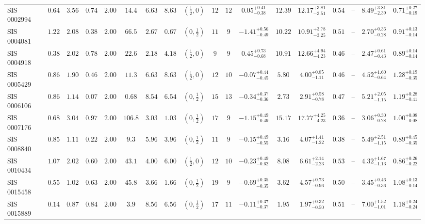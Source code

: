 \begin{longtable}{@{}lccccccccccccccccc@{}}
SIS 0002994 & $0.64$ & $3.56$ & $0.74$ & $2.00$ & $14.4$ & $6.63$ & $8.63$ & $(\frac12,0)$ & $12$ & $12$ & $0.05^{+0.41}_{-0.38}$ & $12.39$ & $12.17^{+3.81}_{-3.51}$ & $0.54$ & -- & $8.49^{+3.81}_{-2.39}$ & $0.71^{+0.27}_{-0.19}$\\
SIS 0004081 & $1.22$ & $2.08$ & $0.38$ & $2.00$ & $66.5$ & $2.67$ & $0.67$ & $(0,\frac12)$ & $11$ & $9$ & $-1.41^{+0.56}_{-0.49}$ & $10.22$ & $10.91^{+3.78}_{-3.25}$ & $0.51$ & -- & $2.70^{+0.36}_{-0.28}$ & $0.91^{+0.13}_{-0.14}$\\
SIS 0004918 & $0.38$ & $2.02$ & $0.78$ & $2.00$ & $22.6$ & $2.18$ & $4.18$ & $(\frac12,0)$ & $9$ & $9$ & $0.45^{+0.73}_{-0.68}$ & $10.91$ & $12.66^{+4.94}_{-4.23}$ & $0.46$ & -- & $2.47^{+0.61}_{-0.43}$ & $0.89^{+0.14}_{-0.14}$\\
SIS 0005429 & $0.86$ & $1.90$ & $0.46$ & $2.00$ & $11.3$ & $6.63$ & $8.63$ & $(\frac12,0)$ & $12$ & $10$ & $-0.07^{+0.44}_{-0.45}$ & $5.80$ & $4.00^{+0.85}_{-1.11}$ & $0.46$ & -- & $4.52^{+1.60}_{-0.64}$ & $1.28^{+0.19}_{-0.35}$\\
SIS 0006106 & $0.86$ & $1.14$ & $0.07$ & $2.00$ & $0.68$ & $8.54$ & $6.54$ & $(0,\frac12)$ & $15$ & $13$ & $-0.34^{+0.37}_{-0.36}$ & $2.73$ & $2.91^{+0.58}_{-0.78}$ & $0.47$ & -- & $5.21^{+2.05}_{-1.15}$ & $1.19^{+0.28}_{-0.41}$\\
SIS 0007176 & $0.68$ & $3.04$ & $0.97$ & $2.00$ & $106.8$ & $3.03$ & $1.03$ & $(0,\frac12)$ & $17$ & $9$ & $-1.15^{+0.49}_{-0.49}$ & $15.17$ & $17.77^{+4.25}_{-4.23}$ & $0.36$ & -- & $3.06^{+0.30}_{-0.28}$ & $1.00^{+0.08}_{-0.08}$\\
SIS 0008840 & $0.85$ & $1.11$ & $0.22$ & $2.00$ & $9.3$ & $5.96$ & $3.96$ & $(0,\frac12)$ & $11$ & $9$ & $-0.15^{+0.49}_{-0.55}$ & $3.16$ & $4.07^{+1.41}_{-1.22}$ & $0.38$ & -- & $5.49^{+2.51}_{-1.15}$ & $0.89^{+0.45}_{-0.35}$\\
SIS 0010434 & $1.07$ & $2.02$ & $0.60$ & $2.00$ & $43.1$ & $4.00$ & $6.00$ & $(\frac12,0)$ & $12$ & $10$ & $-0.23^{+0.49}_{-0.62}$ & $8.08$ & $6.61^{+2.14}_{-2.23}$ & $0.53$ & -- & $4.32^{+1.67}_{-1.13}$ & $0.86^{+0.26}_{-0.22}$\\
SIS 0015458 & $0.55$ & $1.02$ & $0.63$ & $2.00$ & $45.8$ & $3.66$ & $1.66$ & $(0,\frac12)$ & $19$ & $9$ & $-0.69^{+0.35}_{-0.35}$ & $3.62$ & $4.57^{+0.73}_{-0.96}$ & $0.50$ & -- & $3.45^{+0.46}_{-0.36}$ & $1.08^{+0.13}_{-0.14}$\\
SIS 0015889 & $0.14$ & $0.87$ & $0.84$ & $2.00$ & $3.9$ & $8.56$ & $6.56$ & $(0,\frac12)$ & $17$ & $11$ & $-0.11^{+0.37}_{-0.37}$ & $1.95$ & $1.97^{+0.32}_{-0.50}$ & $0.51$ & -- & $7.00^{+1.52}_{-1.01}$ & $1.18^{+0.24}_{-0.24}$\\

\end{longtable}
